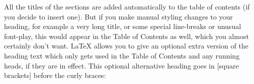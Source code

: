 
All the titles of the sections are added automatically to the table of contents
(if you decide to insert one). But if you make manual styling changes to your
heading, for example a very long title, or some special line-breaks or unusual
font-play, this would appear in the Table of Contents as well, which you almost
certainly don't want. LaTeX allows you to give an optional extra version of the
heading text which only gets used in the Table of Contents and any running
heads, if they are in effect. This optional alternative heading goes in [square
brackets] before the curly braces:

